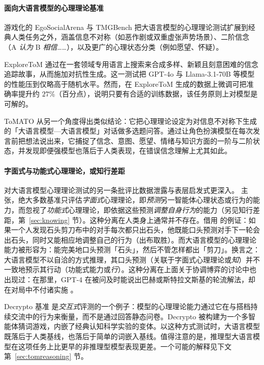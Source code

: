 \paragraph{面向大语言模型的心理理论基准} 游戏化的 EgoSocialArena \citep{hou2024entering} 与 TMGBench \citep{wang2024tmgbenchsystematicgamebenchmark} 把大语言模型的心理理论测试扩展到经典人类任务之外，涵盖信息不对称（如恶作剧或双重虚张声势场景）、二阶信念（A \textit{认为} B \textit{相信}……），以及更广的心理状态分类（例如愿望、怀疑）。

ExploreToM \citep{sclar2024explore} 通过在一套领域专用语言上搜索来合成多样、新颖且刻意困难的信念追踪故事，从而施加对抗性生成。这一测试把 GPT-4o 与 Llama-3.1-70B 等模型的性能压到仅略高于随机水平。然而，在 ExploreToM 生成的数据上微调可把准确率提升约 $27$\%（百分点），说明只要有合适的训练数据，该任务原则上对模型是可解的。

ToMATO \citep{shinoda2025tomato} 从另一个角度得出类似结论：它把心理理论设定为对信息不对称下生成的「大语言模型—大语言模型」对话做多选题问答。通过让角色扮演模型在每次发言前把想法说出来，它捕捉了信念、意图、愿望、情绪与知识方面的一阶与二阶状态，并发现即便强模型也落后于人类表现，在错误信念理解上尤其如此。


\paragraph{字面式与功能式心理理论，或知行差距}
对大语言模型心理理论测试的另一条批评比数据泄露与表层启发式更深入。\citet{riemer2024position} 主张，绝大多数基准只评估\emph{字面式}心理理论，即\emph{预测}另一智能体心理状态或行为的能力，而忽视了\emph{功能式}心理理论，即依据这些预测\emph{调整自身行为}的能力（另见知行差距，第~\ref{sec:knowing} 节）。这种分离在人类身上通常并不存在。借用 \citet{riemer2024position} 的例证：如果一个人发现石头剪刀布中的对手每次都只出石头，他既能口头预测对手下一轮会出石头，同时又能相应地调整自己的行为（出布取胜）。而大语言模型的心理理论能力被形容为：能完美地口头预测「石头」，然后不管怎样都出「剪刀」。换言之：大语言模型不以自洽的方式推理，其口头预测（关联于字面式心理理论或{\em 知}）并不一致地预示其行动（功能式能力或{\em 行}）。这种分离在上面关于协调博弈的讨论中也出现过：在那里，GPT-4 在被问及时能说出巴赫或斯特拉文斯基的轮流解法，却在对局中不付诸实施 \citep{akata2025playing}。

Decrypto 基准 \citep{lupu2025decrypto} 是\emph{交互式}评测的一个例子：模型的心理理论能力通过它在与搭档持续交流中的行为来衡量，而不是通过回答静态问卷。Decrypto 被构建为一个多智能体猜词游戏，内嵌了经典认知科学实验的变体。以这种方式测试时，大语言模型既落后于人类基线，也落后于简单的词嵌入基线。值得注意的是，推理型大语言模型在这项任务上比更早的非推理型模型表现更差。一个可能的解释见下文第~\ref{sec:tomreasoning} 节。

